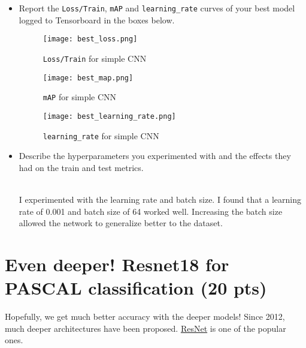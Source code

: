 \documentclass[11pt,addpoints,answers]{exam}
\numberwithin{equation}{section} %
\numberwithin{figure}{section} %
\numberwithin{table}{section} %
\begin{document}
\begin{itemize}
\begin{itemize}
        \item Report the \texttt{Loss/Train}, \texttt{mAP} and \texttt{learning\_rate} curves of your best model logged to Tensorboard in the boxes below.
        
        \begin{figure}[H]
            \centering
            \texttt{[image: best\_loss.png]}
            \caption{\texttt{Loss/Train} for simple CNN}
            \label{fig:q1_2_loss}
        \end{figure}
        
        \begin{figure}[H]
            \centering
            \texttt{[image: best\_map.png]}
            \caption{\texttt{mAP} for simple CNN}
            \label{fig:q1_2_map}
        \end{figure}
        
        \begin{figure}[H]
            \centering
            \texttt{[image: best\_learning\_rate.png]}
            \caption{\texttt{learning\_rate} for simple CNN}
            \label{fig:q1_2_lr}
        \end{figure}
        
        \item Describe the hyperparameters you experimented with and the effects they had on the train and test metrics.

        \begin{solution}
        \\ I experimented with the learning rate and batch size. 
        I found that a learning rate of 0.001 and batch size of 64 worked well.
        Increasing the batch size allowed the network to generalize better to the dataset.
        \end{solution}
    \end{itemize}
\end{itemize}

\clearpage

\section{Even deeper! Resnet18 for PASCAL classification (20 pts)}

Hopefully, we get much better accuracy with the deeper models! Since 2012, much deeper architectures have been proposed. \href{https://arxiv.org/abs/1512.03385}{ResNet} is one of the popular ones.
\end{document}

